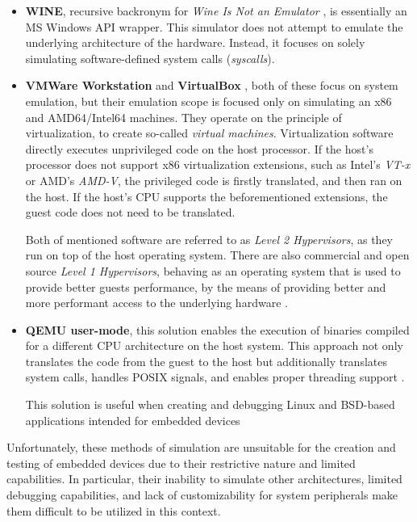 \begin{itemize}
	\item{\textbf{WINE}, recursive backronym for \textit{Wine Is Not an Emulator} \cite{Wine}, is essentially an MS
	Windows API wrapper. This simulator does not attempt to emulate the underlying architecture of the hardware.
	Instead, it focuses on solely simulating software-defined system calls (\textit{syscalls}).}
	\item{\textbf{VMWare Workstation} \cite{VMWareWorkstation} and \textbf{VirtualBox} \cite{VirtualBox}, both of these
	focus on system emulation, but their emulation scope is focused only on simulating an x86 and AMD64/Intel64 machines.
	They operate on the principle of virtualization, to create so-called \textit{virtual machines}. Virtualization
	software directly executes unprivileged code on the host processor. If the host's processor does not support
	x86 virtualization extensions, such as Intel's \textit{VT-x} or AMD's \textit{AMD-V}, the privileged code is firstly
	translated, and then ran on the host. If the host's CPU supports the beforementioned extensions, the guest code does
	not need to be translated.

	Both of mentioned software are referred to as \textit{Level 2 Hypervisors}, as they run on top of the host
	operating system. There are also commercial and open source \textit{Level 1 Hypervisors}, behaving
	as an operating system that is used to provide better guests performance, by the means of providing better and more
	performant access to the underlying hardware \cite{Graniszewski_Waldemar_Performance_2016}.}
	\item{\textbf{QEMU user-mode}, this solution enables the execution of binaries compiled for a different CPU
	architecture on the host system. This approach not only translates the code from the guest to the host but
	additionally translates system calls, handles POSIX signals, and enables proper threading support
	\cite{QemuUser}.

	This solution is useful when creating and debugging Linux and BSD-based applications intended for embedded devices}
\end{itemize}

Unfortunately, these methods of simulation are unsuitable for the creation and testing of embedded devices due to their
restrictive nature and limited capabilities. In particular, their inability to simulate other architectures, limited
debugging capabilities, and lack of customizability for system peripherals make them difficult to be utilized in this
context.

